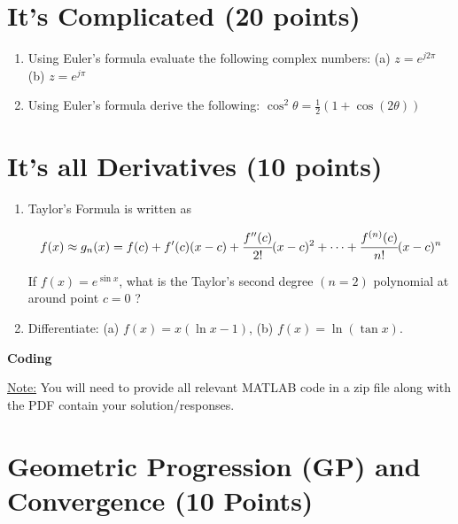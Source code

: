 \documentclass[12pt, xcolor=dvipsnames,svgnames,x11names]{article}
\begin{document}
   \section{It's Complicated (20 points)}
   \begin{enumerate}


      \item Using Euler’s formula evaluate the following complex numbers: (a) $ z = e^{j2\pi}$ (b) $z = e^{j\pi}$

      \item Using Euler’s formula derive the following: $\cos^2 \theta = \tfrac{1}{2}( 1 + \cos (2\theta))$
   \end{enumerate}

   \section{It's all Derivatives (10 points)}
   \begin{enumerate}
      \item Taylor’s Formula is written as

   $$
   f(x) \approx g_n(x) = f(c) + f'(c)(x-c) + \cfrac{f''(c)}{2!}(x-c)^2 + \cdots + \cfrac{f^{(n)}(c)}{n!}(x-c)^n
   $$


   If $f(x) = e^{\sin x}$, what is the Taylor’s second degree $(n = 2)$ polynomial at around point $c = 0$ ?

   \item Differentiate: (a) $f(x) = x( \ln x - 1)$, (b) $f(x) = \ln (\tan x)$.
   \end{enumerate}


{{\LARGE \textbf{Coding}}}

\underline{Note:} You will need to provide all relevant MATLAB code in a zip file along with the PDF contain your solution/responses.

\section{Geometric Progression (GP) and Convergence (10 Points)}
\end{document}
